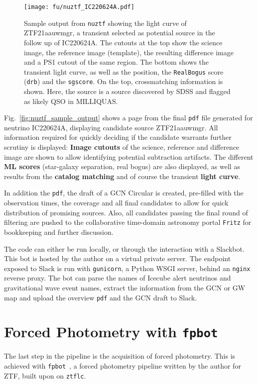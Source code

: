 \begin{figure}[h!]
    \texttt{[image: fu/nuztf\_IC220624A.pdf]}
    \caption[\texttt{nuztf} output]{Sample output from \texttt{nuztf} showing the light curve of ZTF21aauwmgr, a transient selected as potential source in the follow up of IC220624A. The cutouts at the top show the science image, the reference image (template), the resulting difference image and a PS1 cutout of the same region. The bottom shows the transient light curve, as well as the position, the \texttt{RealBogus} score (\texttt{drb}) and the \texttt{sgscore}. On the top, crossmatching information is shown. Here, the source is a source discovered by SDSS and flagged as likely QSO in MILLIQUAS.}
\end{figure}
Fig.~\ref{fig:nuztf_sample_output} shows a page from the final \texttt{pdf} file generated for neutrino IC220624A, displaying candidate source ZTF21aauwmgr. All information required for quickly deciding if the candidate warrants further scrutiny is displayed: \textbf{Image cutouts} of the science, reference and difference image are shown to allow identifying potential subtraction artifacts. The different \textbf{ML scores} (star-galaxy separation, real bogus) are also displayed, as well as results from the \textbf{catalog matching} and of course the transient \textbf{light curve}.

In addition the \texttt{pdf}, the draft of a GCN Circular is created, pre-filled with the observation times, the coverage and all final candidates to allow for quick distribution of promising sources. Also, all candidates passing the final round of filtering are pushed to the collaborative time-domain astronomy portal \texttt{Fritz} for bookkeeping and further discussion.

The code can either be run locally, or through the interaction with a Slackbot. This bot is hosted by the author on a virtual private server. The endpoint exposed to Slack is run with \texttt{gunicorn}, a Python WSGI server, behind an \texttt{nginx} reverse proxy. The bot can parse the names of Icecube alert neutrinos and gravitational wave event names, extract the information from the GCN or GW map and upload the overview \texttt{pdf} and the GCN draft to Slack.

\section{Forced Photometry with \texttt{fpbot}}\label{fpbot}
The last step in the pipeline is the acquisition of forced photometry. This is achieved with \texttt{fpbot}~, a forced photometry pipeline written by the author for ZTF, built upon on \texttt{ztflc}.

